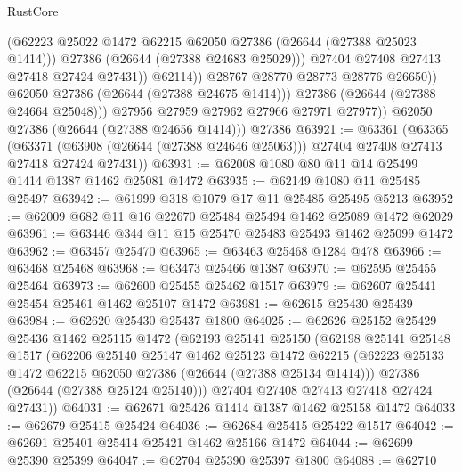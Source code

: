 \begin{lexlean}{RustCore}
\begin{coremodule}
                            (@62223
                              @25022
                              @1472
                              @62215
                              @62050
                              @27386
                              (@26644 (@27388 @25023 @1414)))
                            @27386
                            (@26644 (@27388 @24683 @25029)))
                          @27404
                          @27408
                          @27413
                          @27418
                          @27424
                          @27431))
                      @62114))
                  @28767
                  @28770
                  @28773
                  @28776
                  @26650))
              @62050
              @27386
              (@26644 (@27388 @24675 @1414)))
            @27386
            (@26644 (@27388 @24664 @25048)))
          @27956
          @27959
          @27962
          @27966
          @27971
          @27977))
      @62050
      @27386
      (@26644 (@27388 @24656 @1414)))
    @27386
@63921 := @63361
    (@63365
      (@63371 (@63908 (@26644 (@27388 @24646 @25063))) @27404 @27408 @27413 @27418 @27424 @27431))
@63931 := @62008 @1080 @80 @11 @14 @25499 @1414 @1387 @1462 @25081 @1472
@63935 := @62149 @1080 @11 @25485 @25497
@63942 := @61999 @318 @1079 @17 @11 @25485 @25495 @5213
@63952 := @62009 @682 @11 @16 @22670 @25484 @25494 @1462 @25089 @1472 @62029
@63961 := @63446 @344 @11 @15 @25470 @25483 @25493 @1462 @25099 @1472
@63962 := @63457 @25470
@63965 := @63463 @25468 @1284 @478
@63966 := @63468 @25468
@63968 := @63473 @25466 @1387
@63970 := @62595 @25455 @25464
@63973 := @62600 @25455 @25462 @1517
@63979 := @62607 @25441 @25454 @25461 @1462 @25107 @1472
@63981 := @62615 @25430 @25439
@63984 := @62620 @25430 @25437 @1800
@64025 := @62626
    @25152
    @25429
    @25436
    @1462
    @25115
    @1472
    (@62193
      @25141
      @25150
      (@62198
        @25141
        @25148
        @1517
        (@62206
          @25140
          @25147
          @1462
          @25123
          @1472
          @62215
          (@62223 @25133 @1472 @62215 @62050 @27386 (@26644 (@27388 @25134 @1414)))
          @27386
          (@26644 (@27388 @25124 @25140)))
        @27404
        @27408
        @27413
        @27418
        @27424
        @27431))
@64031 := @62671 @25426 @1414 @1387 @1462 @25158 @1472
@64033 := @62679 @25415 @25424
@64036 := @62684 @25415 @25422 @1517
@64042 := @62691 @25401 @25414 @25421 @1462 @25166 @1472
@64044 := @62699 @25390 @25399
@64047 := @62704 @25390 @25397 @1800
@64088 := @62710

\end{coremodule}
\end{lexlean}
